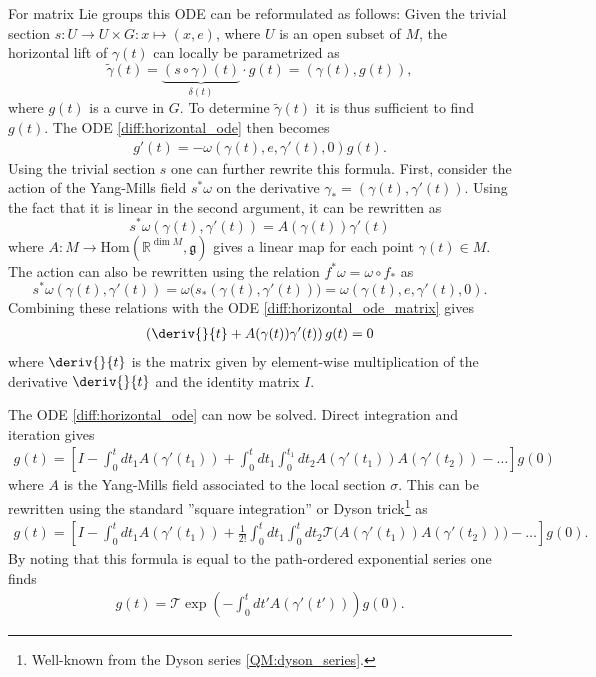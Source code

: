     \begin{example}
         For matrix Lie groups this ODE can be reformulated as follows: Given the trivial section $s:U\rightarrow U\times G:x\mapsto (x, e)$, where $U$ is an open subset of $M$, the horizontal lift of $\gamma(t)$ can locally be parametrized as \[\widetilde{\gamma}(t) = \underbrace{(s\circ\gamma)(t)}_{\delta(t)}\cdot g(t) = (\gamma(t), g(t)),\] where $g(t)$ is a curve in $G$. To determine $\widetilde{\gamma}(t)$ it is thus sufficient to find $g(t)$. The ODE \ref{diff:horizontal_ode} then becomes
        \begin{gather}
            \label{diff:horizontal_ode_matrix}
            g'(t) = -\omega(\gamma(t), e, \gamma'(t), 0)g(t).
        \end{gather}
        Using the trivial section $s$ one can further rewrite this formula. First, consider the action of the Yang-Mills field $s^*\omega$ on the derivative $\gamma_* = (\gamma(t), \gamma'(t))$. Using the fact that it is linear in the second argument, it can be rewritten as \[s^*\omega(\gamma(t), \gamma'(t)) = A(\gamma(t))\gamma'(t)\] where $A:M\rightarrow\text{Hom}(\mathbb{R}^{\dim M}, \mathfrak{g})$ gives a linear map for each point $\gamma(t)\in M$. The action can also be rewritten using the relation $f^*\omega = \omega\circ f_\ast$ as\[s^*\omega(\gamma(t), \gamma'(t)) = \omega\Big(s_\ast(\gamma(t), \gamma'(t))\Big) = \omega(\gamma(t), e, \gamma'(t), 0).\] Combining these relations with the ODE \ref{diff:horizontal_ode_matrix} gives
        \begin{gather}
            \label{diff:horizontal_ode_derivative}
            \left(\deriv{}{t} + A(\gamma(t))\gamma'(t)\right)g(t) = 0
        \end{gather}
        where $\deriv{}{t}$ is the matrix given by element-wise multiplication of the derivative $\deriv{}{t}$ and the identity matrix $I$.

        The ODE \ref{diff:horizontal_ode} can now be solved. Direct integration and iteration gives
        \begin{gather}
            g(t) = \left[I - \int_0^tdt_1A(\gamma'(t_1)) + \int_0^tdt_1\int_0^{t_1}dt_2A(\gamma'(t_1))A(\gamma'(t_2))-\ldots\right]g(0)
        \end{gather}
        where $A$ is the Yang-Mills field associated to the local section $\sigma$. This can be rewritten using the standard ''square integration'' or Dyson trick\footnote{Well-known from the Dyson series \ref{QM:dyson_series}.} as
        \begin{gather}
            g(t) = \left[I - \int_0^tdt_1A(\gamma'(t_1)) + \frac{1}{2!}\int_0^tdt_1\int_0^tdt_2\mathcal{T}\Big(A(\gamma'(t_1))A(\gamma'(t_2))\Big)-\ldots\right]g(0).
        \end{gather}
        By noting that this formula is equal to the path-ordered exponential series one finds
        \begin{gather}
            \label{diff:g0_to_gt}
            g(t) = \mathcal{T}\exp\left(-\int_0^tdt'A(\gamma'(t'))\right)g(0).
        \end{gather}
    \end{example}

